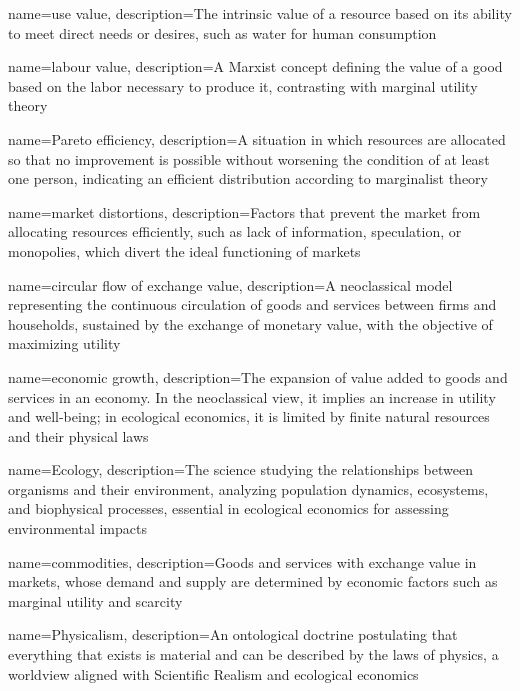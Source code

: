 {
	name=use value,
	description={The intrinsic value of a resource based on its ability to meet direct needs or desires, such as water for human consumption}
}

{
	name=labour value,
	description={A Marxist concept defining the value of a good based on the labor necessary to produce it, contrasting with marginal utility theory}
}

{
	name=Pareto efficiency,
	description={A situation in which resources are allocated so that no improvement is possible without worsening the condition of at least one person, indicating an efficient distribution according to marginalist theory}
}

{
	name=market distortions,
	description={Factors that prevent the market from allocating resources efficiently, such as lack of information, speculation, or monopolies, which divert the ideal functioning of markets}
}

{
	name=circular flow of exchange value,
	description={A neoclassical model representing the continuous circulation of goods and services between firms and households, sustained by the exchange of monetary value, with the objective of maximizing utility}
}

{
	name=economic growth,
	description={The expansion of value added to goods and services in an economy. In the neoclassical view, it implies an increase in utility and well-being; in ecological economics, it is limited by finite natural resources and their physical laws}
}

{
	name=Ecology,
	description={The science studying the relationships between organisms and their environment, analyzing population dynamics, ecosystems, and biophysical processes, essential in ecological economics for assessing environmental impacts}
}

{
	name=commodities,
	description={Goods and services with exchange value in markets, whose demand and supply are determined by economic factors such as marginal utility and scarcity}
}

{
	name=Physicalism,
	description={An ontological doctrine postulating that everything that exists is material and can be described by the laws of physics, a worldview aligned with Scientific Realism and ecological economics}
}

